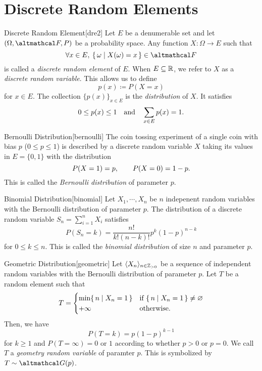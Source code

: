 \documentclass[../probability.tex]{subfiles}
\begin{document}
\section{Discrete Random Elements}

\begin{Definition}{Discrete Random Element}[dre2]
    Let \(E\) be a denumerable set and let \((\Omega, \mcal{F}, P)\) be a
    probability space. Any function \(X \colon \Omega \to E\) such that
    \[
        \fall x \in E,\: \{\,\omega \mid X(\omega) = x\,\} \in \mcal{F}
    \]
    is called a \emph{discrete random element} of \(E\).
    When \(E \subseteq \RR\), we refer to \(X\) as a \emph{discrete random variable}.
    This allows us to define
    \[
        p(x) \coloneqq P(X = x)
    \]
    for \(x \in E\).
    The collection \(\{p(x)\}_{x \in E}\)
    is the \emph{distribution} of \(X\). It satisfies
    \[
        0 \le p(x) \le 1\quad\text{and}\quad
        \sum_{x \in E} p(x) = 1\text.
    \]
\end{Definition}


\begin{Example}{Bernoulli Distribution}[bernoulli]
    The coin tossing experiment of a single coin with bias \(p\) (\(0 \le p \le 1\))
    is described by a discrete random variable \(X\)
    taking its values in \(E = \{0,1\}\) with the distribution
    \[
        P(X = 1) = p,\qquad P(X = 0) = 1-p\text.
    \]
    This is called the \emph{Bernoulli distribution} of parameter \(p\).
\end{Example}

\begin{Example}{Binomial Distribution}[binomial]
    Let \(X_1, \cdots, X_n\) be \(n\) indepenent random variables
    with the Bernoulli distribution of parameter \(p\).
    The distribution of a discrete random variable \(S_n = \sum_{i=1}^n X_i\)
    satisfies
    \[
        P(S_n = k) = \frac{n!}{k!(n-k)!} p^k (1-p)^{n-k}
    \]
    for \(0 \le k \le n\).
    This is called the \emph{binomial distribution} of size \(n\) and parameter \(p\).
\end{Example}

\begin{Example}{Geometric Distribution}[geometric]
    Let \(\lang X_n \rang_{n \in \ZZ_{>0}}\)
    be a sequence of independent random variables with the Bernoulli distribution of parameter
    \(p\).
    Let \(T\) be a random element such that
    \[
        T = \begin{cases}
            \min \{\,n \mid X_n = 1\,\} & \text{if }\{\,n \mid X_n = 1\,\} \neq \varnothing \\
            +\infty & \text{otherwise.}
        \end{cases}
    \]
    Then, we have
    \[
        P(T = k) = p(1-p)^{k-1}
    \]
    for \(k \ge 1\) and \(P(T = \infty) = 0 \text{ or } 1\) according to whether \(p > 0\)
    or \(p = 0\).
    We call \(T\) a \emph{geometry random variable} of paramter \(p\).
    This is symbolized by \(T \sim \mcal{G}(p)\).
\end{Example}
\end{document}
